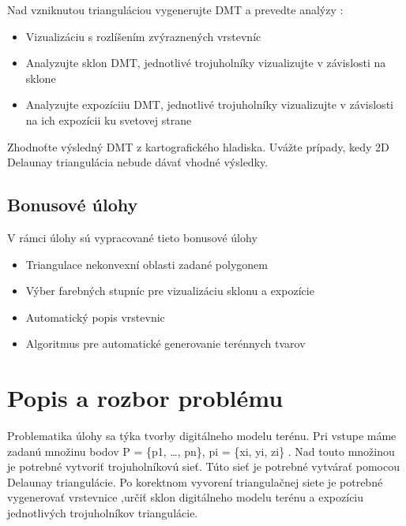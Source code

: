 \documentclass[12pt]{article}
\begin{document}
Nad vzniknutou trianguláciou vygenerujte DMT a prevedte analýzy :

\begin{itemize}
\item Vizualizáciu s rozlíšením zvýraznených vrstevníc 
\item Analyzujte sklon DMT, jednotlivé trojuholníky vizualizujte v závislosti na sklone
\item Analyzujte expozíciiu DMT, jednotlivé trojuholníky vizualizujte v závislosti na ich expozícii ku svetovej strane
\end{itemize}
		
Zhodnoťte výsledný DMT z kartografického hladiska. Uvážte prípady, kedy 2D Delaunay triangulácia nebude dávať vhodné výsledky.

\subsection{Bonusové úlohy}
V rámci úlohy sú vypracované tieto bonusové úlohy

\begin{itemize}
\item Triangulace nekonvexní oblasti zadané polygonem
\item Výber farebných stupníc pre vizualizáciu sklonu a expozície
\item Automatický popis vrstevnic
\item Algoritmus pre automatické generovanie terénnych tvarov
\end{itemize}
\clearpage 
\section{Popis a rozbor problému}
Problematika úlohy sa týka tvorby digitálneho modelu terénu. Pri vstupe máme zadanú množinu bodov P = \{p1, …, pn\},  p{i} = \{x{i}, y{i}, z{i}\} . Nad touto množinou je potrebné vytvoriť trojuholníkovú sieť. Túto sieť je potrebné vytvárať pomocou Delaunay triangulácie. Po korektnom vyvorení triangulačnej siete je potrebné vygenerovať vrstevnice ,určiť sklon digitálneho modelu terénu a expozíciu jednotlivých trojuholníkov triangulácie.
\end{document}
